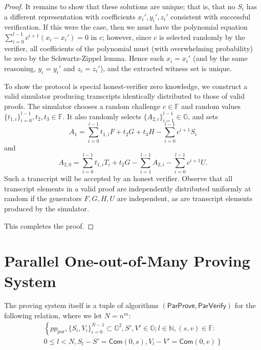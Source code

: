 \documentclass{llncs}
\newcommand{\G}{\mathbb{G}}
\newcommand{\F}{\mathbb{F}}
\newcommand{\func}[1]{\mathsf{#1}}
\newcommand{\com}{\func{Com}}
\begin{document}
\begin{proof}
It remains to show that these solutions are unique; that is, that no $S_i$ has a different representation with coefficients $x_i',y_i',z_i'$ consistent with successful verification.
If this were the case, then we must have the polynomial equation $\sum_{i=0}^{l-1} c^{i+1}(x_i - x_i') = 0$ in $c$; however, since $c$ is selected randomly by the verifier, all coefficients of the polynomial must (with overwhelming probability) be zero by the Schwartz-Zippel lemma.
Hence each $x_i = x_i'$ (and by the same reasoning, $y_i = y_i'$ and $z_i = z_i'$), and the extracted witness set is unique.

To show the protocol is special honest-verifier zero knowledge, we construct a valid simulator producing transcripts identically distributed to those of valid proofs.
The simulator chooses a random challenge $c \in \F$ and random values $\{t_{1,i}\}_{i=0}^{l-1}, t_2, t_3 \in \F$.
It also randomly selects $\{A_{2,i}\}_{i=1}^{l-1} \in \G$, and sets $$A_1 = \sum_{i=0}^{l-1} t_{1,i} F + t_2 G + t_3 H - \sum_{i=0}^{l-1} c^{i+1} S_i$$ and $$A_{2,0} = \sum_{i=0}^{l-1} t_{1,i} T_i + t_2 G - \sum_{i=1}^{l-1} A_{2,i} -  \sum_{i=0}^{l-1} c^{i+1} U.$$
Such a transcript will be accepted by an honest verifier.
Observe that all transcript elements in a valid proof are independently distributed uniformly at random if the generators $F,G,H,U$ are independent, as are transcript elements produced by the simulator.

This completes the proof.
\end{proof}


\section{Parallel One-out-of-Many Proving System}
\label{app:parallel}

The proving system itself is a tuple of algorithms $(\func{ParProve},\func{ParVerify})$ for the following relation, where we let $N = n^m$:
\begin{multline*}
\left\{ pp_{\text{par}}, \{S_i,V_i\}_{i=0}^{N-1} \subset \G^2, S',V' \in \G ; l \in \mathbb{N}, (s,v) \in \F : \right. \\
\left. 0 \leq l < N, S_l - S' = \com(0,s), V_l - V' = \com(0,v) \right\}
\end{multline*}
\end{document}

